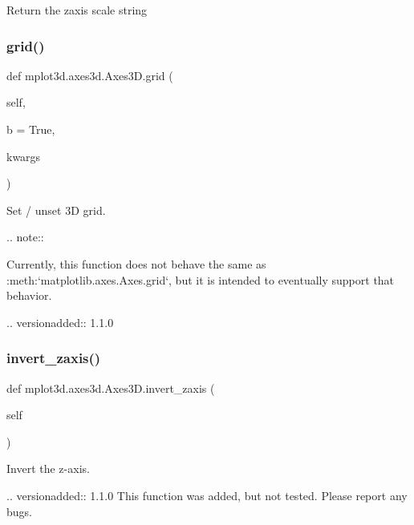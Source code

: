 \begin{DoxyVerb}Return the zaxis scale string %
 \mbox{\label{classmplot3d_1_1axes3d_1_1Axes3D_a21f1f98c865aaa7c19714fa8be3e6f57}} 
\subsubsection{\texorpdfstring{grid()}{grid()}}
{\footnotesize\ttfamily def mplot3d.\+axes3d.\+Axes3\+D.\+grid (\begin{DoxyParamCaption}\item[{}]{self,  }\item[{}]{b = {\ttfamily True},  }\item[{}]{kwargs }\end{DoxyParamCaption})}

\begin{DoxyVerb}Set / unset 3D grid.

.. note::

    Currently, this function does not behave the same as
    :meth:`matplotlib.axes.Axes.grid`, but it is intended to
    eventually support that behavior.

.. versionadded:: 1.1.0
\end{DoxyVerb}
 \mbox{\label{classmplot3d_1_1axes3d_1_1Axes3D_afa06e93a70a6ea388d1f2026d8059d83}} 
\subsubsection{\texorpdfstring{invert\+\_\+zaxis()}{invert\_zaxis()}}
{\footnotesize\ttfamily def mplot3d.\+axes3d.\+Axes3\+D.\+invert\+\_\+zaxis (\begin{DoxyParamCaption}\item[{}]{self }\end{DoxyParamCaption})}

\begin{DoxyVerb}Invert the z-axis.

.. versionadded:: 1.1.0
    This function was added, but not tested. Please report any bugs.
\end{DoxyVerb}
 \mbox{\label{classmplot3d_1_1axes3d_1_1Axes3D_a58b3d7431fe2e9832e903a29b8882158}} 

\end{DoxyVerb}
